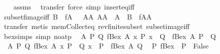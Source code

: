 \begin{isabellebody}
%
\isadelimproof
\ \ %
\endisadelimproof
%
\isatagproof
{}\isamarkupfalse%
\ assms\ \isamarkupfalse%
\ transfer\ {\isacharparenleft}force\ simp{\isacharcolon}\ insert{\isacharunderscore}eq{\isacharunderscore}iff{\isacharparenright}%
\endisatagproof
{\isafoldproof}%
%
\isadelimproof
%
\endisadelimproof
%
\isadelimdocument
%
\endisadelimdocument
%
\isatagdocument
%
\isamarkuptrue%
%
\endisatagdocument
{\isafolddocument}%
%
\isadelimdocument
%
\endisadelimdocument
{}\isamarkupfalse%
\ subset{\isacharunderscore}fimage{\isacharunderscore}iff{\isacharcolon}\ {\isachardoublequoteopen}{\isacharparenleft}B\ {\isacharbar}{\isasymsubseteq}{\isacharbar}\ f{\isacharbar}{\isacharbackquote}{\isacharbar}A{\isacharparenright}\ {\isacharequal}\ {\isacharparenleft}{\isasymexists}\ AA{\isachardot}\ AA\ {\isacharbar}{\isasymsubseteq}{\isacharbar}\ A\ {\isasymand}\ B\ {\isacharequal}\ f{\isacharbar}{\isacharbackquote}{\isacharbar}AA{\isacharparenright}{\isachardoublequoteclose}\isanewline
%
\isadelimproof
%
\endisadelimproof
%
\isatagproof
{}\isamarkupfalse%
\ transfer\ {\isacharparenleft}metis\ mem{\isacharunderscore}Collect{\isacharunderscore}eq\ rev{\isacharunderscore}finite{\isacharunderscore}subset\ subset{\isacharunderscore}image{\isacharunderscore}iff{\isacharparenright}%
\endisatagproof
{\isafoldproof}%
%
\isadelimproof
%
\endisadelimproof
%
\isadelimdocument
%
\endisadelimdocument
%
\isatagdocument
%
\isamarkuptrue%
%
\endisatagdocument
{\isafolddocument}%
%
\isadelimdocument
%
\endisadelimdocument
{}\isamarkupfalse%
\ bex{\isacharunderscore}simps\ {\isacharbrackleft}simp{\isacharcomma}\ no{\isacharunderscore}atp{\isacharbrackright}{\isacharcolon}\isanewline
\ \ {\isachardoublequoteopen}{\isasymAnd}A\ P\ Q{\isachardot}\ fBex\ A\ {\isacharparenleft}{\isasymlambda}x{\isachardot}\ P\ x\ {\isasymand}\ Q{\isacharparenright}\ {\isacharequal}\ {\isacharparenleft}fBex\ A\ P\ {\isasymand}\ Q{\isacharparenright}{\isachardoublequoteclose}\isanewline
\ \ {\isachardoublequoteopen}{\isasymAnd}A\ P\ Q{\isachardot}\ fBex\ A\ {\isacharparenleft}{\isasymlambda}x{\isachardot}\ P\ {\isasymand}\ Q\ x{\isacharparenright}\ {\isacharequal}\ {\isacharparenleft}P\ {\isasymand}\ fBex\ A\ Q{\isacharparenright}{\isachardoublequoteclose}\isanewline
\ \ {\isachardoublequoteopen}{\isasymAnd}P{\isachardot}\ fBex\ {\isacharbraceleft}{\isacharbar}{\isacharbar}{\isacharbraceright}\ P\ {\isacharequal}\ False{\isachardoublequoteclose}\isanewline

\end{isabellebody}
